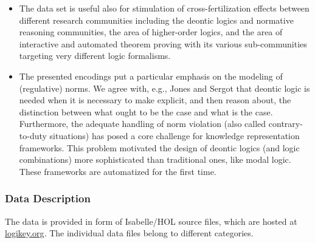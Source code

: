 \documentclass{article}
\newcommand{\comment}[1]{
}
\begin{document}
\begin{itemize}
\item The data set is useful also for stimulation of
  cross-fertilization effects between different research communities including
  the deontic logics  and normative reasoning communities,
  the area of higher-order logics, and the area of  interactive
  and automated theorem proving with its various sub-communities targeting
  very different logic formalisms.

\item The presented encodings put a particular emphasis on the
  modeling of (regulative) norms. We agree with, e.g., Jones and
  Sergot \cite{Jones1992-JONDLI} that deontic logic is needed when it is necessary to make
  explicit, and then reason about, the distinction between what ought
  to be the case and what is the case. Furthermore, the adequate
  handling of norm violation (also called contrary-to-duty situations)
  has posed a core challenge for knowledge representation
  frameworks. This problem motivated the design of deontic logics (and logic combinations) more sophisticated than traditional ones, like modal logic. These frameworks are automatized for the first time. 


\end{itemize}

\comment{
[Provide 3-6 bullet points explaining why these data are of value to the scientific community. Bullet points 1-3 must specifically answer the question in red next to the bullet point, but do not include the question itself in your answer (i.e.,for the first bullet, you should explain why these data are useful but delete the “Why are these data useful?” question text itself). You may provide up to 3 additional bullet points to outline the value of these data. Please keep points brief.
·	Why are these data useful?
·	Who can benefit from these data?
·	How can these data be used for further insights and development of experiments?
·	 What is the additional value of these data?
·	…
·	…]
}

\subsubsection*{Data Description}
The data is provided in form of Isabelle/HOL source files, which are
hosted at \url{logikey.org}. The individual data files belong to different
categories. 
\end{document}
